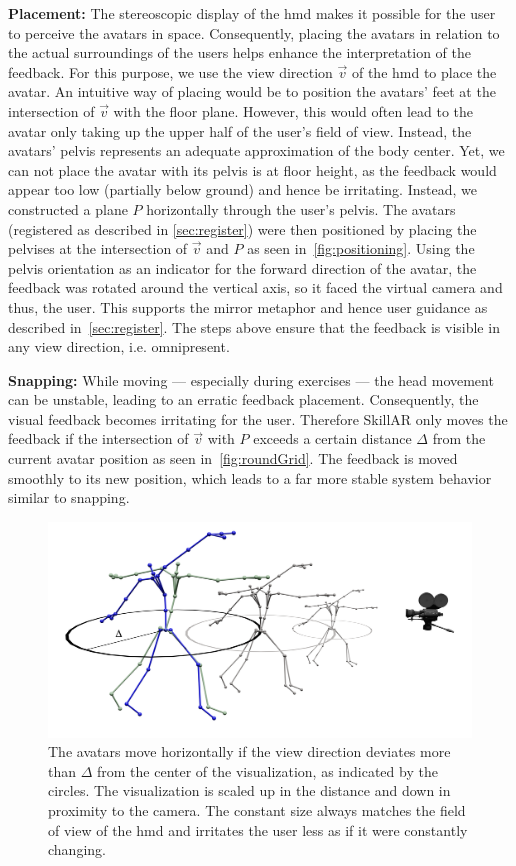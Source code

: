 \textbf{Placement:}
The stereoscopic display of the \acrshort{hmd} makes it possible for the user to perceive the avatars in space. Consequently, placing the avatars in relation to the actual surroundings of the users helps enhance the interpretation of the feedback. For this purpose, we use the view direction $\vec{v}$ of the \acrshort{hmd} to place the avatar. An intuitive way of placing would be to position the avatars' feet at the intersection of $\vec{v}$ with the floor plane. However, this would often lead to the avatar only taking up the upper half of the user's field of view. Instead, the avatars' pelvis represents an adequate approximation of the body center. Yet, we can not place the avatar with its pelvis is at floor height, as the feedback would appear too low (partially below ground) and hence be irritating. Instead, we constructed a plane $P$ horizontally through the user's pelvis. The avatars (registered as described in \autoref{sec:register}) were then positioned by placing the pelvises at the intersection of $\vec{v}$ and $P$ as seen in~\autoref{fig:positioning}. Using the pelvis orientation as an indicator for the forward direction of the avatar, the feedback was rotated around the vertical axis, so it faced the virtual camera and thus, the user. This supports the mirror metaphor and hence user guidance as described in~\autoref{sec:register}. The steps above ensure that the feedback is visible in any view direction, i.e. omnipresent.

\textbf{Snapping:}
While moving --- especially during exercises --- the head movement can be unstable, leading to an erratic feedback placement. Consequently, the visual feedback becomes irritating for the user. Therefore SkillAR only moves the feedback if the intersection of $\vec{v}$ with $P$ exceeds a certain distance $\Delta$ from the current avatar position as seen in~\autoref{fig:roundGrid}. The feedback is moved smoothly to its new position, which leads to a far more stable system behavior similar to snapping.

\begin{figure}[h!]
	\centering
	\includegraphics[width=0.6\linewidth]{pictures/gridRound.png}
	\caption[Spatial stabilization of the feedback positioning.]{The avatars move horizontally if the view direction deviates more than $\Delta$ from the center of the visualization, as indicated by the circles. The visualization is scaled up in the distance and down in proximity to the camera. The constant size always matches the field of view of the \acrshort{hmd} and irritates the user less as if it were constantly changing.\label{fig:roundGrid}}
\end{figure}

